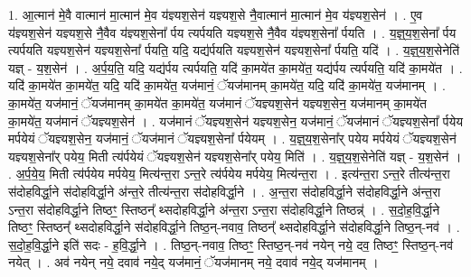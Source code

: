 \documentclass[17pt]{extarticle}
\begin{document}
1. आ॒त्मान॑ मे॒वै वात्मान॑ मा॒त्मान॑ मे॒व य॑ज्ञ्यश॒सेन॑ यज्ञ्यश॒से नै॒वात्मान॑ मा॒त्मान॑ मे॒व य॑ज्ञ्यश॒सेन॑ । . ए॒व य॑ज्ञ्यश॒सेन॑ यज्ञ्यश॒से नै॒वैव य॑ज्ञ्यश॒सेना᳚ र्पय त्यर्पयति यज्ञ्यश॒से नै॒वैव य॑ज्ञ्यश॒सेना᳚ र्पयति । . य॒ज्ञ्॒य॒श॒सेना᳚ र्पय त्यर्पयति यज्ञ्यश॒सेन॑ यज्ञ्यश॒सेना᳚ र्पयति॒ यदि॒ यद्य॑र्पयति यज्ञ्यश॒सेन॑ यज्ञ्यश॒सेना᳚ र्पयति॒ यदि॑ । . य॒ज्ञ्॒य॒श॒सेनेति॑ यज्ञ् - य॒श॒सेन॑ । . अ॒र्प॒य॒ति॒ यदि॒ यद्य॑र्पय त्यर्पयति॒ यदि॑ का॒मये॑त का॒मये॑त॒ यद्य॑र्पय त्यर्पयति॒ यदि॑ का॒मये॑त । . यदि॑ का॒मये॑त का॒मये॑त॒ यदि॒ यदि॑ का॒मये॑त॒ यज॑मानं॒ ॅयज॑मानम् का॒मये॑त॒ यदि॒ यदि॑ का॒मये॑त॒ यज॑मानम् । . का॒मये॑त॒ यज॑मानं॒ ॅयज॑मानम् का॒मये॑त का॒मये॑त॒ यज॑मानं ॅयज्ञ्यश॒सेन॑ यज्ञ्यश॒सेन॒ यज॑मानम् का॒मये॑त का॒मये॑त॒ यज॑मानं ॅयज्ञ्यश॒सेन॑ । . यज॑मानं ॅयज्ञ्यश॒सेन॑ यज्ञ्यश॒सेन॒ यज॑मानं॒ ॅयज॑मानं ॅयज्ञ्यश॒सेना᳚ र्पयेय मर्पयेयं ॅयज्ञ्यश॒सेन॒ यज॑मानं॒ ॅयज॑मानं ॅयज्ञ्यश॒सेना᳚ र्पयेयम् । . य॒ज्ञ्॒य॒श॒सेना᳚र् पयेय मर्पयेयं ॅयज्ञ्यश॒सेन॑ यज्ञ्यश॒सेना᳚र् पयेय॒ मिती त्य॑र्पयेयं ॅयज्ञ्यश॒सेन॑ यज्ञ्यश॒सेना᳚र् पयेय॒ मिति॑ । . य॒ज्ञ्॒य॒श॒सेनेति॑ यज्ञ् - य॒श॒सेन॑ । . अ॒र्प॒ये॒य॒ मिती त्य॑र्पयेय मर्पयेय॒ मित्य॑न्त॒रा ऽन्त॒रे त्य॑र्पयेय मर्पयेय॒ मित्य॑न्त॒रा । . इत्य॑न्त॒रा ऽन्त॒रे तीत्य॑न्त॒रा स॑दोहविर्द्धा॒ने स॑दोहविर्द्धा॒ने अ॑न्त॒रे तीत्य॑न्त॒रा स॑दोहविर्द्धा॒ने । . अ॒न्त॒रा स॑दोहविर्द्धा॒ने स॑दोहविर्द्धा॒ने अ॑न्त॒रा ऽन्त॒रा स॑दोहविर्द्धा॒ने तिष्ठꣳ॒॒ 
स्तिष्ठन्᳚ थ्सदोहविर्द्धा॒ने अ॑न्त॒रा ऽन्त॒रा स॑दोहविर्द्धा॒ने तिष्ठन्न्॑ । . स॒दो॒ह॒वि॒र्द्धा॒ने तिष्ठꣳ॒॒ स्तिष्ठन्᳚ थ्सदोहविर्द्धा॒ने स॑दोहविर्द्धा॒ने तिष्ठ॒न्-नवाव॒ तिष्ठन्᳚ थ्सदोहविर्द्धा॒ने स॑दोहविर्द्धा॒ने तिष्ठ॒न्-नव॑ । . स॒दो॒ह॒वि॒र्द्धा॒ने इति॑ सदः - ह॒वि॒र्द्धा॒ने । . तिष्ठ॒न्-नवाव॒ तिष्ठꣳ॒॒ स्तिष्ठ॒न्-नव॑ नयेन् नये॒ दव॒ तिष्ठꣳ॒॒ स्तिष्ठ॒न्-नव॑ नयेत् । . अव॑ नयेन् नये॒ दवाव॑ नये॒द् यज॑मानं॒ ॅयज॑मानम् नये॒ दवाव॑ नये॒द् यज॑मानम् । \newline
\end{document}
